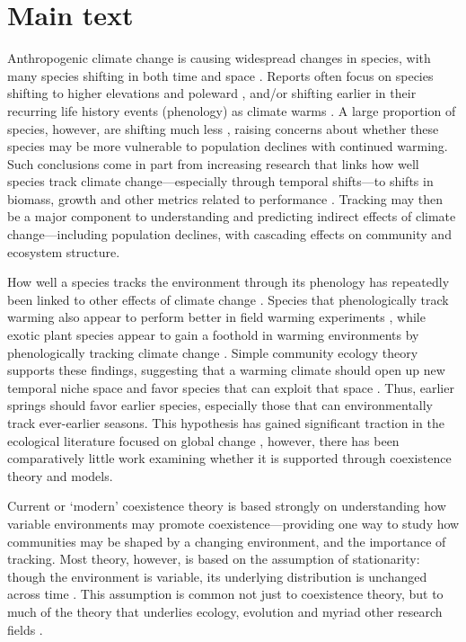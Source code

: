 \documentclass[11pt,letterpaper]{article}
\begin{document}
\section{Main text}
Anthropogenic climate change is causing widespread changes in species, with many species shifting in both time and space \citep{IPCC:2014sm}. Reports often focus on species shifting to higher elevations and poleward \citep{Chen2011}, and/or shifting earlier in their recurring life history events (phenology) as climate warms \citep{Menzel:2006sq,Wolkovich:2012n,cohen2018}. A large proportion of species, however, are shifting much less \citep{Cook:2012pnas}, raising concerns about whether these species may be more vulnerable to population declines with continued warming. Such conclusions come in part from increasing research that links how well species track climate change---especially through temporal shifts---to shifts in biomass, growth and other metrics related to performance \citep{Cleland:2012}. Tracking may then be a major component to understanding and predicting indirect effects of climate change---including population declines, with cascading effects on community and ecosystem structure.

How well a species tracks the environment through its phenology has repeatedly been linked to other effects of climate change \citep{Cleland:2012,ramula2015}. Species that phenologically track warming also appear to perform better in field warming experiments \citep{Cleland:2012}, while exotic plant species appear to gain a foothold in warming environments by phenologically tracking climate change \citep{Willis:2010al}. Simple community ecology theory supports these findings, suggesting that a warming climate should open up new temporal niche space and favor species that can exploit that space \citep{gotelli1996,wolkovich:2010fee,Zettlemoyer2019}. Thus, earlier springs should favor earlier species, especially those that can environmentally track ever-earlier seasons. This hypothesis has gained significant traction in the ecological literature focused on global change \citep[e.g.,][]{Cleland:2012}, however, there has been comparatively little work examining whether it is supported through coexistence theory and models. 

Current or `modern' coexistence theory is based strongly on understanding how variable environments may promote coexistence---providing one way to study how communities may be shaped by a changing environment, and the importance of tracking. Most theory, however, is based on the assumption of stationarity: though the environment is variable, its underlying distribution is unchanged across time \citep{barabas2018}. This assumption is common not just to coexistence theory, but to much of the theory that underlies ecology, evolution and myriad other research fields \citep[e.g.,][]{nosenko2013,Milly:2008yu}. 
\end{document}
